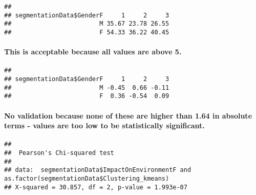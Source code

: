 \documentclass[
]{article}
\newenvironment{Shaded}{\begin{snugshade}}{\end{snugshade}}
\newcommand{\DecValTok}[1]{\textcolor[rgb]{0.00,0.00,0.81}{#1}}
\newcommand{\FunctionTok}[1]{\textcolor[rgb]{0.00,0.00,0.00}{#1}}
\newcommand{\NormalTok}[1]{#1}
\newcommand{\OtherTok}[1]{\textcolor[rgb]{0.56,0.35,0.01}{#1}}
\newcommand{\SpecialCharTok}[1]{\textcolor[rgb]{0.00,0.00,0.00}{#1}}
\begin{document}
\begin{verbatim}
##                         
## segmentationData$GenderF     1     2     3
##                        M 35.67 23.78 26.55
##                        F 54.33 36.22 40.45
\end{verbatim}

\hypertarget{this-is-acceptable-because-all-values-are-above-5.}{%
\paragraph{This is acceptable because all values are above
5.}\label{this-is-acceptable-because-all-values-are-above-5.}}

\begin{Shaded}
\end{Shaded}

\begin{verbatim}
##                         
## segmentationData$GenderF     1     2     3
##                        M -0.45  0.66 -0.11
##                        F  0.36 -0.54  0.09
\end{verbatim}

\hypertarget{no-validation-because-none-of-these-are-higher-than-1.64-in-absolute-terms---values-are-too-low-to-be-statistically-significant.}{%
\paragraph{No validation because none of these are higher than 1.64 in
absolute terms - values are too low to be statistically
significant.}\label{no-validation-because-none-of-these-are-higher-than-1.64-in-absolute-terms---values-are-too-low-to-be-statistically-significant.}}

\begin{Shaded}
\end{Shaded}

\begin{verbatim}
## 
##  Pearson's Chi-squared test
## 
## data:  segmentationData$ImpactOnEnvironmentF and as.factor(segmentationData$Clustering_kmeans)
## X-squared = 30.857, df = 2, p-value = 1.993e-07
\end{verbatim}
\end{document}
